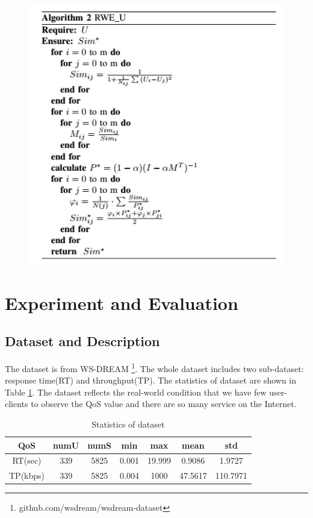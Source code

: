 \documentclass[conference]{IEEEtran}
\begin{document}
\begin{figure}[H]
    \includegraphics[width=0.45\paperwidth]{alg2.png}
    \end{figure}


\section{Experiment and Evaluation}\label{S-EE}
\subsection{Dataset and Description}
The dataset is from WS-DREAM \footnote{github.com/wsdream/wsdream-dataset}. The whole dataset includes two sub-dataset: response time(RT) and throughput(TP). The statistics of dataset are shown in Table \ref{tb1}. The dataset reflects the real-world condition that we have few user-clients to observe the QoS value and there are so many service on the Internet. 
\begin{table}[H]
\begin{threeparttable}
\caption{Statistics of dataset}
\label{tb1}
\begin{tabular}{c||c|c|c|c|c|c} 
\hline 
QoS & numU & numS & min & max & mean & std \\ 
\hline 
RT(sec) & 339   & 5825  & 0.001 & 19.999 & 0.9086 & 1.9727 \\ 
\hline 
TP(kbps) & 339   & 5825  & 0.004 & 1000  & 47.5617 & 110.7971  \\ 
\hline 
\end{tabular} 
\end{threeparttable}
\end{table}
\end{document}
